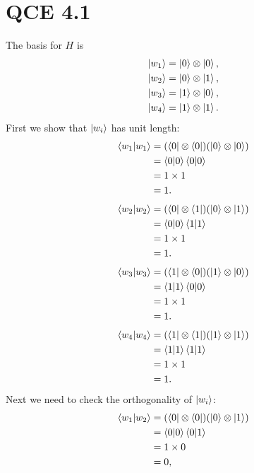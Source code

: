 \documentclass[10pt]{article}
\begin{document}
\section*{QCE 4.1}
The basis for $H$ is
\begin{align*}
\ket{w_1} &= \ket{0} \otimes \ket{0}, \\
\ket{w_2} &= \ket{0} \otimes \ket{1}, \\
\ket{w_3} &= \ket{1} \otimes \ket{0}, \\
\ket{w_4} &= \ket{1} \otimes \ket{1}.
\end{align*}
First we show that $\ket{w_i}$ has unit length:
\begin{align*}
\braket{w_1 | w_1} &= (\bra{0} \otimes \bra{0})(\ket{0} \otimes \ket{0} ) \\
							  &= \braket{ 0 | 0 } \braket{0 | 0} \\
							  &= 1 \times 1 \\
							  &= 1.
\end{align*}\begin{align*}
\braket{w_2 | w_2} &= (\bra{0} \otimes \bra{1})(\ket{0} \otimes \ket{1} ) \\
							  &= \braket{ 0 | 0 } \braket{1 | 1} \\
							  &= 1 \times 1 \\
							  &= 1.
\end{align*}\begin{align*}
\braket{w_3 | w_3} &= (\bra{1} \otimes \bra{0})(\ket{1} \otimes \ket{0} ) \\
							  &= \braket{ 1 | 1 } \braket{0 | 0} \\
							  &= 1 \times 1 \\
							  &= 1.
\end{align*}\begin{align*}
\braket{w_4 | w_4} &= (\bra{1} \otimes \bra{1})(\ket{1} \otimes \ket{1} ) \\
							  &= \braket{ 1 | 1 } \braket{1 | 1} \\
							  &= 1 \times 1 \\
							  &= 1.
\end{align*}
Next we need to check the orthogonality of $\ket{w_i}$:
\begin{align*}
\braket{ w_1 | w_2  } &= ( \bra{ 0 } \otimes \bra{ 0 } ) ( \ket{ 0 } \otimes \ket{ 1 } ) \\
 					&= \braket{ 0 | 0 } \braket{ 0 | 1 } \\
 					&= 1 \times 0 \\
 					&= 0,
\end{align*}
\end{document}

